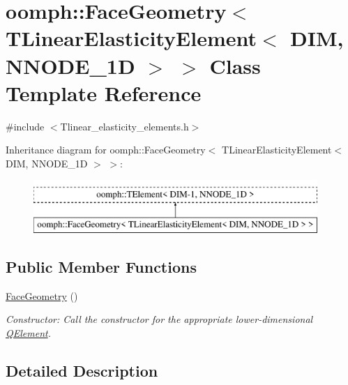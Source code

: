 \hypertarget{classoomph_1_1FaceGeometry_3_01TLinearElasticityElement_3_01DIM_00_01NNODE__1D_01_4_01_4}{}\section{oomph\+:\+:Face\+Geometry$<$ T\+Linear\+Elasticity\+Element$<$ D\+IM, N\+N\+O\+D\+E\+\_\+1D $>$ $>$ Class Template Reference}
\label{classoomph_1_1FaceGeometry_3_01TLinearElasticityElement_3_01DIM_00_01NNODE__1D_01_4_01_4}


{\ttfamily \#include $<$Tlinear\+\_\+elasticity\+\_\+elements.\+h$>$}

Inheritance diagram for oomph\+:\+:Face\+Geometry$<$ T\+Linear\+Elasticity\+Element$<$ D\+IM, N\+N\+O\+D\+E\+\_\+1D $>$ $>$\+:\begin{figure}[H]
\begin{center}
\leavevmode
\includegraphics[height=2.000000cm]{classoomph_1_1FaceGeometry_3_01TLinearElasticityElement_3_01DIM_00_01NNODE__1D_01_4_01_4}
\end{center}
\end{figure}
\subsection*{Public Member Functions}
\begin{DoxyCompactItemize}
\item 
\hyperlink{classoomph_1_1FaceGeometry_3_01TLinearElasticityElement_3_01DIM_00_01NNODE__1D_01_4_01_4_a94fc7f3850033e0ab5ebcc1208d22b25}{Face\+Geometry} ()
\begin{DoxyCompactList}\small\item\em Constructor\+: Call the constructor for the appropriate lower-\/dimensional \hyperlink{classoomph_1_1QElement}{Q\+Element}. \end{DoxyCompactList}\end{DoxyCompactItemize}


\subsection{Detailed Description}
